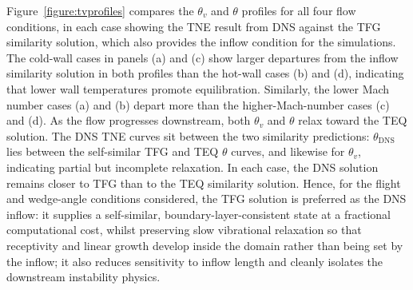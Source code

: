 
Figure~\ref{figure:tvprofiles} compares the $\theta_v$ and $\theta$ profiles for all four flow conditions, in each case showing the \gls{TNE} result from \gls{DNS} against the \gls{TFG} similarity solution, which also provides the inflow condition for the simulations. The cold-wall cases in panels (a) and (c) show larger departures from the inflow similarity solution in both profiles than the hot-wall cases (b) and (d), indicating that lower wall temperatures promote equilibration. Similarly, the lower Mach number cases (a) and (b) depart more than the higher-Mach-number cases (c) and (d). As the flow progresses downstream, both $\theta_v$ and $\theta$ relax toward the \gls{TEQ} solution. The DNS \gls{TNE} curves sit between the two similarity predictions: $\theta_{\text{DNS}}$ lies between the self-similar \gls{TFG} and \gls{TEQ} $\theta$ curves, and likewise for $\theta_v$, indicating partial but incomplete relaxation. In each case, the \gls{DNS} solution remains closer to \gls{TFG} than to the \gls{TEQ} similarity solution. Hence, for the flight and wedge-angle conditions considered, the \gls{TFG} solution is preferred as the \gls{DNS} inflow: it supplies a self-similar, boundary-layer-consistent state at a fractional computational cost, whilst preserving slow vibrational relaxation so that receptivity and linear growth develop inside the domain rather than being set by the inflow; it also reduces sensitivity to inflow length and cleanly isolates the downstream instability physics.



